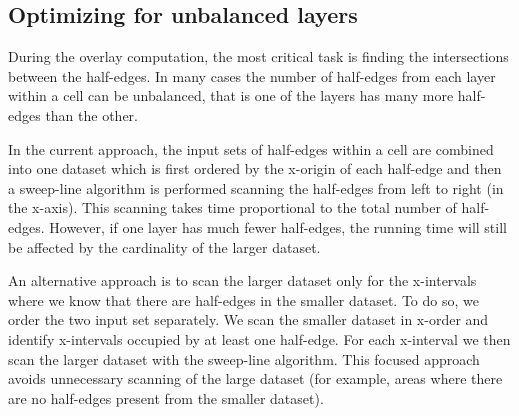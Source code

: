 \subsection{Optimizing for unbalanced layers}\label{sec:unbalance}
During the overlay computation, the most critical task is finding the intersections between the half-edges.
In many cases the number of half-edges from each layer within a cell can be unbalanced, that is one of the layers has many more half-edges than the other.

In the current approach, the input sets of half-edges within a cell are combined into one dataset which is first ordered by the x-origin of each half-edge and then a sweep-line algorithm is performed scanning the half-edges from left to right (in the x-axis).
This scanning takes time proportional to the total number of half-edges.
However, if one layer has much fewer half-edges, the running time will still be affected by the cardinality of the larger dataset.

An alternative approach is to scan the larger dataset only for the x-intervals where we know that there are half-edges in the smaller dataset.
To do so, we order the two input set separately. We scan the smaller dataset in x-order and identify x-intervals occupied by at least one half-edge. 
For each x-interval we then scan the larger dataset with the sweep-line algorithm. 
This focused approach avoids unnecessary scanning of the large dataset (for example, areas where there are no half-edges present from the smaller dataset).
